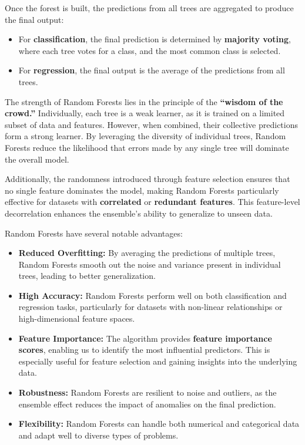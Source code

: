 \documentclass[
]{book}
\providecommand{\tightlist}{%
  \setlength{\itemsep}{0pt}\setlength{\parskip}{0pt}}
\theoremstyle{definition}
\theoremstyle{definition}
\theoremstyle{definition}
\theoremstyle{definition}
\theoremstyle{remark}
\begin{document}
Once the forest is built, the predictions from all trees are aggregated to produce the final output:

\begin{itemize}
\tightlist
\item
  For \textbf{classification}, the final prediction is determined by \textbf{majority voting}, where each tree votes for a class, and the most common class is selected.\\
\item
  For \textbf{regression}, the final output is the average of the predictions from all trees.
\end{itemize}

The strength of Random Forests lies in the principle of the \textbf{``wisdom of the crowd.''} Individually, each tree is a weak learner, as it is trained on a limited subset of data and features. However, when combined, their collective predictions form a strong learner. By leveraging the diversity of individual trees, Random Forests reduce the likelihood that errors made by any single tree will dominate the overall model.

Additionally, the randomness introduced through feature selection ensures that no single feature dominates the model, making Random Forests particularly effective for datasets with \textbf{correlated} or \textbf{redundant features}. This feature-level decorrelation enhances the ensemble's ability to generalize to unseen data.

Random Forests have several notable advantages:

\begin{itemize}
\tightlist
\item
  \textbf{Reduced Overfitting:} By averaging the predictions of multiple trees, Random Forests smooth out the noise and variance present in individual trees, leading to better generalization.\\
\item
  \textbf{High Accuracy:} Random Forests perform well on both classification and regression tasks, particularly for datasets with non-linear relationships or high-dimensional feature spaces.\\
\item
  \textbf{Feature Importance:} The algorithm provides \textbf{feature importance scores}, enabling us to identify the most influential predictors. This is especially useful for feature selection and gaining insights into the underlying data.\\
\item
  \textbf{Robustness:} Random Forests are resilient to noise and outliers, as the ensemble effect reduces the impact of anomalies on the final prediction.\\
\item
  \textbf{Flexibility:} Random Forests can handle both numerical and categorical data and adapt well to diverse types of problems.
\end{itemize}
\end{document}
